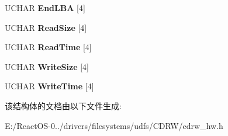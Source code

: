\begin{DoxyCompactItemize}
U\+C\+H\+AR {\bfseries End\+L\+BA} \mbox{[}4\mbox{]}
\item 
\mbox{\label{struct___s_e_t___s_t_r_e_a_m_i_n_g___p_e_r_f_o_r_m_a_n_c_e___d_e_s_c_r_i_p_t_o_r_ab77afe20c1cc95e730b5fe1cc9eb414c}} 
U\+C\+H\+AR {\bfseries Read\+Size} \mbox{[}4\mbox{]}
\item 
\mbox{\label{struct___s_e_t___s_t_r_e_a_m_i_n_g___p_e_r_f_o_r_m_a_n_c_e___d_e_s_c_r_i_p_t_o_r_ace1d2b4b3173f02090f1b03b93c77f08}} 
U\+C\+H\+AR {\bfseries Read\+Time} \mbox{[}4\mbox{]}
\item 
\mbox{\label{struct___s_e_t___s_t_r_e_a_m_i_n_g___p_e_r_f_o_r_m_a_n_c_e___d_e_s_c_r_i_p_t_o_r_ade5031e5dd32e776bd2b4495acd99be4}} 
U\+C\+H\+AR {\bfseries Write\+Size} \mbox{[}4\mbox{]}
\item 
\mbox{\label{struct___s_e_t___s_t_r_e_a_m_i_n_g___p_e_r_f_o_r_m_a_n_c_e___d_e_s_c_r_i_p_t_o_r_a4dca87b5070007110fcf14dc00025a92}} 
U\+C\+H\+AR {\bfseries Write\+Time} \mbox{[}4\mbox{]}
\end{DoxyCompactItemize}


该结构体的文档由以下文件生成\+:\begin{DoxyCompactItemize}
\item 
E\+:/\+React\+O\+S-\/0../drivers/filesystems/udfs/\+C\+D\+R\+W/cdrw\+\_\+hw.\+h\end{DoxyCompactItemize}
